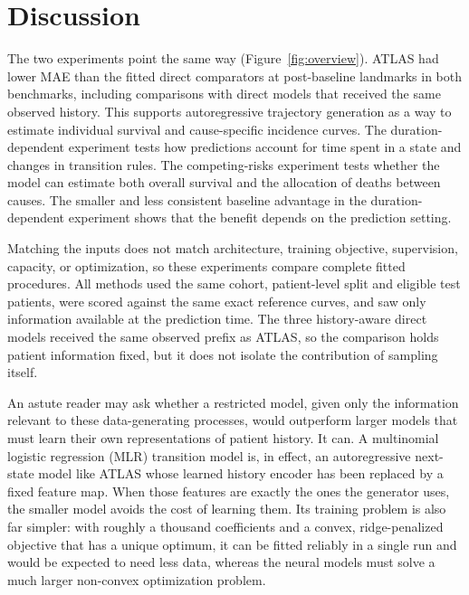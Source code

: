 \section{Discussion}
\label{sec:discussion}
The two experiments point the same way (Figure~\ref{fig:overview}). ATLAS had lower MAE than the fitted direct comparators at post-baseline landmarks in both benchmarks, including comparisons with direct models that received the same observed history. This supports autoregressive trajectory generation as a way to estimate individual survival and cause-specific incidence curves. The duration-dependent experiment tests how predictions account for time spent in a state and changes in transition rules. The competing-risks experiment tests whether the model can estimate both overall survival and the allocation of deaths between causes. The smaller and less consistent baseline advantage in the duration-dependent experiment shows that the benefit depends on the prediction setting.

Matching the inputs does not match architecture, training objective, supervision, capacity, or optimization, so these experiments compare complete fitted procedures. All methods used the same cohort, patient-level split and eligible test patients, were scored against the same exact reference curves, and saw only information available at the prediction time. The three history-aware direct models received the same observed prefix as ATLAS, so the comparison holds patient information fixed, but it does not isolate the contribution of sampling itself.

An astute reader may ask whether a restricted model, given only the information relevant to these data-generating processes, would outperform larger models that must learn their own representations of patient history. It can. A multinomial logistic regression (MLR) transition model is, in effect, an autoregressive next-state model like ATLAS whose learned history encoder has been replaced by a fixed feature map. When those features are exactly the ones the generator uses, the smaller model avoids the cost of learning them. Its training problem is also far simpler: with roughly a thousand coefficients and a convex, ridge-penalized objective that has a unique optimum, it can be fitted reliably in a single run and would be expected to need less data, whereas the neural models must solve a much larger non-convex optimization problem.

